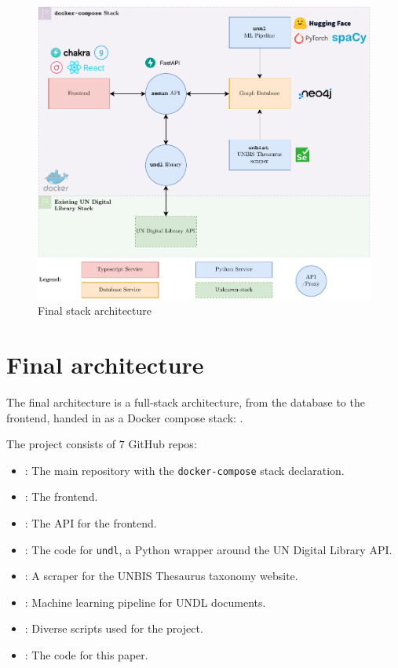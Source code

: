 
\begin{figure}[!htb]
    \centering
    \includegraphics[width=\textwidth]{res/architecture-final.pdf}
    \caption{Final stack architecture}

    \label{fig:architecture}
\end{figure}

\section{Final architecture} \label{sec:final-architecture}

The final architecture is a full-stack architecture, from the database to the frontend, handed in as a Docker compose stack: .

The project consists of $7$ \faGithub{} GitHub repos:

\begin{itemize}
    \item {}: The main repository with the \texttt{docker-compose} stack declaration.
    \item {}: The frontend.
    \item {}: The API for the frontend.
    \item {}: The code for \texttt{undl}, a Python wrapper around the UN Digital Library API.
    \item {}: A scraper for the UNBIS Thesaurus taxonomy website.
    \item {}: Machine learning pipeline for UNDL documents.
    \item {}: Diverse scripts used for the project.
    \item {}: The code for this paper.
\end{itemize}

